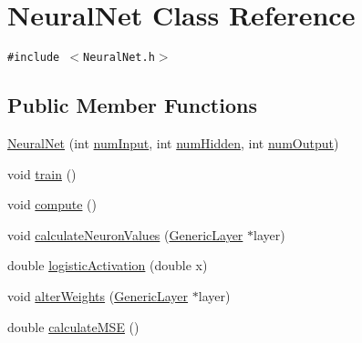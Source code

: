 \hypertarget{classNeuralNet}{
\section{NeuralNet Class Reference}
\label{classNeuralNet}
}
{\tt \#include $<$NeuralNet.h$>$}

\subsection*{Public Member Functions}
\begin{CompactItemize}
\item 
\hyperlink{classNeuralNet_a7045d229a664d8209a919d93108426a}{NeuralNet} (int \hyperlink{classNeuralNet_d46f938b28b505ef25f9d0a3a256ba78}{numInput}, int \hyperlink{classNeuralNet_62cfa0d0238baf0239429fbefd63042c}{numHidden}, int \hyperlink{classNeuralNet_c20e9fd588f7be05e8d658a5b673affe}{numOutput})
\item 
void \hyperlink{classNeuralNet_ae2e3914f799ae37da4f3d088e5259db}{train} ()
\item 
void \hyperlink{classNeuralNet_3ae443739e4e6a6c0d86d5149bde706f}{compute} ()
\item 
void \hyperlink{classNeuralNet_f36ed795560a187aaafc86b82348ae05}{calculateNeuronValues} (\hyperlink{classGenericLayer}{GenericLayer} $\ast$layer)
\item 
double \hyperlink{classNeuralNet_8a49e8b1bf5710e27c57b322ee3bc323}{logisticActivation} (double x)
\item 
void \hyperlink{classNeuralNet_ec1f7f481954c7a3eafdefc8d23070f8}{alterWeights} (\hyperlink{classGenericLayer}{GenericLayer} $\ast$layer)
\item 
double \hyperlink{classNeuralNet_ae5a77ddecea2c9f0c11feb0089dbb03}{calculateMSE} ()
\end{CompactItemize}
